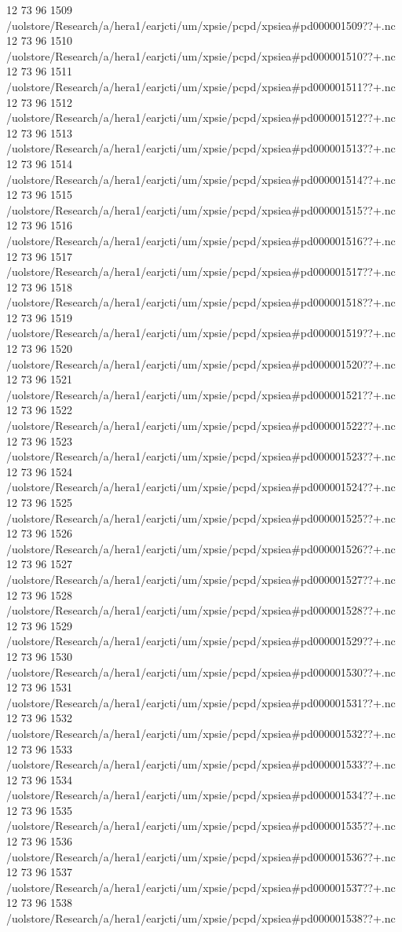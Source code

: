 12 73 96
1509
/uolstore/Research/a/hera1/earjcti/um/xpsie/pcpd/xpsiea#pd000001509??+.nc
12 73 96
1510
/uolstore/Research/a/hera1/earjcti/um/xpsie/pcpd/xpsiea#pd000001510??+.nc
12 73 96
1511
/uolstore/Research/a/hera1/earjcti/um/xpsie/pcpd/xpsiea#pd000001511??+.nc
12 73 96
1512
/uolstore/Research/a/hera1/earjcti/um/xpsie/pcpd/xpsiea#pd000001512??+.nc
12 73 96
1513
/uolstore/Research/a/hera1/earjcti/um/xpsie/pcpd/xpsiea#pd000001513??+.nc
12 73 96
1514
/uolstore/Research/a/hera1/earjcti/um/xpsie/pcpd/xpsiea#pd000001514??+.nc
12 73 96
1515
/uolstore/Research/a/hera1/earjcti/um/xpsie/pcpd/xpsiea#pd000001515??+.nc
12 73 96
1516
/uolstore/Research/a/hera1/earjcti/um/xpsie/pcpd/xpsiea#pd000001516??+.nc
12 73 96
1517
/uolstore/Research/a/hera1/earjcti/um/xpsie/pcpd/xpsiea#pd000001517??+.nc
12 73 96
1518
/uolstore/Research/a/hera1/earjcti/um/xpsie/pcpd/xpsiea#pd000001518??+.nc
12 73 96
1519
/uolstore/Research/a/hera1/earjcti/um/xpsie/pcpd/xpsiea#pd000001519??+.nc
12 73 96
1520
/uolstore/Research/a/hera1/earjcti/um/xpsie/pcpd/xpsiea#pd000001520??+.nc
12 73 96
1521
/uolstore/Research/a/hera1/earjcti/um/xpsie/pcpd/xpsiea#pd000001521??+.nc
12 73 96
1522
/uolstore/Research/a/hera1/earjcti/um/xpsie/pcpd/xpsiea#pd000001522??+.nc
12 73 96
1523
/uolstore/Research/a/hera1/earjcti/um/xpsie/pcpd/xpsiea#pd000001523??+.nc
12 73 96
1524
/uolstore/Research/a/hera1/earjcti/um/xpsie/pcpd/xpsiea#pd000001524??+.nc
12 73 96
1525
/uolstore/Research/a/hera1/earjcti/um/xpsie/pcpd/xpsiea#pd000001525??+.nc
12 73 96
1526
/uolstore/Research/a/hera1/earjcti/um/xpsie/pcpd/xpsiea#pd000001526??+.nc
12 73 96
1527
/uolstore/Research/a/hera1/earjcti/um/xpsie/pcpd/xpsiea#pd000001527??+.nc
12 73 96
1528
/uolstore/Research/a/hera1/earjcti/um/xpsie/pcpd/xpsiea#pd000001528??+.nc
12 73 96
1529
/uolstore/Research/a/hera1/earjcti/um/xpsie/pcpd/xpsiea#pd000001529??+.nc
12 73 96
1530
/uolstore/Research/a/hera1/earjcti/um/xpsie/pcpd/xpsiea#pd000001530??+.nc
12 73 96
1531
/uolstore/Research/a/hera1/earjcti/um/xpsie/pcpd/xpsiea#pd000001531??+.nc
12 73 96
1532
/uolstore/Research/a/hera1/earjcti/um/xpsie/pcpd/xpsiea#pd000001532??+.nc
12 73 96
1533
/uolstore/Research/a/hera1/earjcti/um/xpsie/pcpd/xpsiea#pd000001533??+.nc
12 73 96
1534
/uolstore/Research/a/hera1/earjcti/um/xpsie/pcpd/xpsiea#pd000001534??+.nc
12 73 96
1535
/uolstore/Research/a/hera1/earjcti/um/xpsie/pcpd/xpsiea#pd000001535??+.nc
12 73 96
1536
/uolstore/Research/a/hera1/earjcti/um/xpsie/pcpd/xpsiea#pd000001536??+.nc
12 73 96
1537
/uolstore/Research/a/hera1/earjcti/um/xpsie/pcpd/xpsiea#pd000001537??+.nc
12 73 96
1538
/uolstore/Research/a/hera1/earjcti/um/xpsie/pcpd/xpsiea#pd000001538??+.nc

